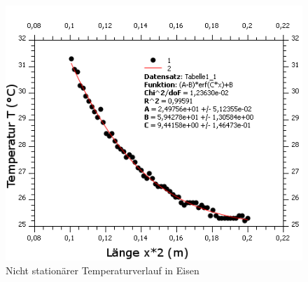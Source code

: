 \documentclass[12pt,a4paper]{article}
\begin{document}
\begin{figure}[H]
	\centering
	\includegraphics[scale=7]{./BilderCorrect/nicht_stationaer_temp_verlauf.png}
	\caption{Nicht stationärer Temperaturverlauf in Eisen}
	\label{fig:nicht_stat_verlauf}
\end{figure}
\end{document}
